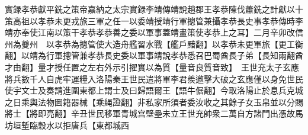 實録孝恭獻平銑之策帝嘉納之太宗實録李靖傳靖說趙郡王孝恭陳伐蕭銑之計獻以十策高祖以孝恭未更戎旅三軍之任一以委靖授靖行軍摠管兼攝孝恭長史事孝恭傳時李靖亦奉使江南以策干孝恭孝恭善之委以軍事蓋靖畫策使孝恭上之耳】二月辛卯改信州為夔州　以孝恭為摠管使大造舟艦習水戰【艦戶黯翻】以孝恭未更軍旅【更工衡翻】以靖為行軍摠管兼孝恭長史委以軍事靖說孝恭悉召巴蜀酋長子弟【長知兩翻酋才由翻】量才授任置之左右外示引擢實以為質【量音良質音致】　王世充太子玄應將兵數千人自虎牢運糧入洛陽秦王世民遣將軍李君羨邀擊大破之玄應僅以身免世民使宇文士及奏請進圍東都上謂士及曰歸語爾王【語牛倨翻】今取洛陽止於息兵克城之日乘輿法物圖籍器械【乘䋲證翻】非私家所須者委汝收之其餘子女玉帛並以分賜將士【將即亮翻】辛丑世民移軍青城宫壁壘未立王世充帥衆二萬自方諸門出憑故馬坊垣塹臨穀水以拒唐兵【東都城西